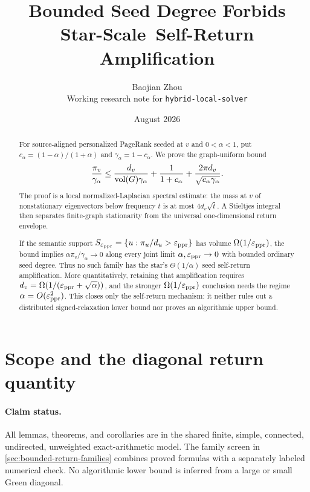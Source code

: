 \documentclass[11pt]{article}
\title{Bounded Seed Degree Forbids Star-Scale\
Self-Return Amplification}
\author{Baojian Zhou\\
\small Working research note for \texttt{hybrid-local-solver}}
\date{August 2026}
\begin{document}
\maketitle

\begin{abstract}
For source-aligned personalized PageRank seeded at $v$ and
$0<\alpha<1$, put
$c_{\alpha}=(1-\alpha)/(1+\alpha)$ and
$\gamma_{\alpha}=1-c_{\alpha}$.  We prove the graph-uniform bound
\[
 \frac{\pi_v}{\gamma_{\alpha}}
 \le
 \frac{d_v}{\operatorname{vol}(G)\gamma_{\alpha}}
 +\frac{1}{1+c_{\alpha}}
 +\frac{2\pi d_v}{\sqrt{c_{\alpha}\gamma_{\alpha}}}.
\]
The proof is a local normalized-Laplacian spectral estimate: the mass at $v$
of nonstationary eigenvectors below frequency $t$ is at most
$4d_v\sqrt t$.  A Stieltjes integral then separates finite-graph stationarity
from the universal one-dimensional return envelope.

If the semantic support
$S_{\varepsilon_{\mathrm{ppr}}}=\{u:\pi_u/d_u>\varepsilon_{\mathrm{ppr}}\}$ has volume
$\Omega(1/\varepsilon_{\mathrm{ppr}})$, the bound implies
$\alpha\pi_v/\gamma_{\alpha}\to0$ along every joint limit
$\alpha,\varepsilon_{\mathrm{ppr}}\to0$ with bounded ordinary seed degree.  Thus no such family
has the star's $\Theta(1/\alpha)$ seed self-return amplification.  More
quantitatively, retaining that amplification requires
$d_v=\Omega(1/(\varepsilon_{\mathrm{ppr}}+\sqrt\alpha))$, and the stronger
$\Omega(1/\varepsilon_{\mathrm{ppr}})$ conclusion needs the regime
$\alpha=O(\varepsilon_{\mathrm{ppr}}^2)$.  This closes only the self-return mechanism: it neither
rules out a distributed signed-relaxation lower bound nor proves an
algorithmic upper bound.
\end{abstract}



\section{Scope and the diagonal return quantity}
\label{sec:bounded-return-scope}

\paragraph{Claim status.}
All lemmas, theorems, and corollaries are \statusproved{} in the shared finite,
simple, connected, undirected, unweighted exact-arithmetic model.  The family
screen in \cref{sec:bounded-return-families} combines proved formulas with a
separately labeled numerical check.  No algorithmic lower bound is inferred
from a large or small Green diagonal.
\end{document}
